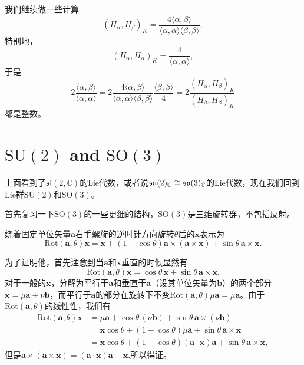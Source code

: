 我们继续做一些计算
\[
(H_\alpha,H_\beta)_K=\frac{4\langle \alpha,\beta \rangle}{\langle \alpha,\alpha \rangle\langle \beta,\beta \rangle},
\]
特别地，
\[
(H_\alpha,H_\alpha)_K=\frac{4}{\langle \alpha,\alpha \rangle},
\]
于是
\[
	2\frac{\langle \alpha,\beta \rangle}{\langle \alpha,\alpha \rangle}=2\frac{4\langle \alpha,\beta \rangle}{\langle \alpha,\alpha \rangle\langle \beta,\beta \rangle}\frac{\langle \beta,\beta \rangle}{4}=2\frac{(H_\alpha,H_\beta)_K}{(H_\beta,H_\beta)_K}
\]
都是整数。

\section{$\mathrm{SU}(2)$ and $\mathrm{SO}(3)$}
上面看到了$\mathfrak{sl}(2,\mathbb{C})$的Lie代数，或者说$\mathfrak{su}(2)_{\mathbb{C}}\cong\mathfrak{so}(3)_{\mathbb{C}}$的Lie代数，现在我们回到Lie群$\mathrm{SU}(2)$和$\mathrm{SO}(3)$。

首先复习一下$\mathrm{SO}(3)$的一些更细的结构，$\mathrm{SO}(3)$是三维旋转群，不包括反射。

\pro
绕着固定单位矢量$\mathbf{a}$右手螺旋的逆时针方向旋转$\theta$后的$\mathbf{x}$表示为
\[
\mathrm{Rot}(\mathbf{a},\theta)\mathbf{x}=\mathbf{x}+(1-\cos\theta)\mathbf{a}\times(\mathbf{a}\times\mathbf{x})+
\sin\theta\,\mathbf{a}\times\mathbf{x}.
\]

为了证明他，首先注意到当$\mathbf{a}$和$\mathbf{x}$垂直的时候显然有
\[
\mathrm{Rot}(\mathbf{a},\theta)\mathbf{x}=\cos\theta\,\mathbf{x}+
\sin\theta\,\mathbf{a}\times\mathbf{x}.
\]
对于一般的$\mathbf{x}$，分解为平行于$\mathbf{a}$和垂直于$\mathbf{a}$（设其单位矢量为$\mathbf{b}$）的两个部分$\mathbf{x}=\mu\mathbf{a}+\nu\mathbf{b}$，而平行于$\mathbf{a}$的部分在旋转下不变$\mathrm{Rot}(\mathbf{a},\theta)\mu\mathbf{a}=\mu\mathbf{a}$。由于$\mathrm{Rot}(\mathbf{a},\theta)$的线性性，我们有
\[
\begin{split}
\mathrm{Rot}(\mathbf{a},\theta)\mathbf{x}&=\mu\mathbf{a}+\cos\theta\,(\nu\mathbf{b})+
\sin\theta\,\mathbf{a}\times(\nu\mathbf{b})\\
&=\mathbf{x}\cos\theta+(1-\cos\theta)\mu\mathbf{a}+
\sin\theta\,\mathbf{a}\times\mathbf{x}\\
&=\mathbf{x}\cos\theta+(1-\cos\theta)(\mathbf{a}\cdot\mathbf{x})\mathbf{a}+
\sin\theta\,\mathbf{a}\times \mathbf{x},
\end{split}
\]
但是$\mathbf{a}\times(\mathbf{a}\times\mathbf{x})=(\mathbf{a}\cdot\mathbf{x})\mathbf{a}-\mathbf{x}$.所以得证。

